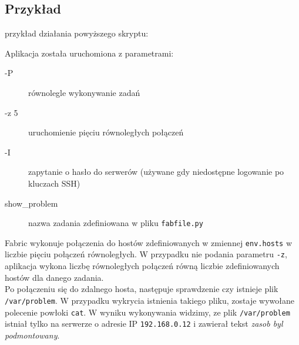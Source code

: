 \subsection{Przykład}

przykład działania powyższego skryptu:

Aplikacja została uruchomiona z parametrami:
\begin{description}
\item[-P] równolegle wykonywanie zadań
\item[-z 5] uruchomienie pięciu równoległych połączeń
\item[-I] zapytanie o hasło do serwerów (używane gdy niedostępne logowanie po kluczach SSH)
\item[show\_problem] nazwa zadania zdefiniowana w pliku \texttt{fabfile.py}
\end{description}
Fabric wykonuje połączenia do hostów zdefiniowanych w zmiennej \texttt{env.hosts} w liczbie pięciu połączeń równoległych.
W przypadku nie podania parametru \texttt{-z}, aplikacja wykona liczbę równoległych połączeń równą liczbie zdefiniowanych hostów dla danego zadania.\\
Po połączeniu się do zdalnego hosta, następuje sprawdzenie czy istnieje plik \texttt{/var/problem}. W przypadku wykrycia istnienia takiego pliku, zostaje wywołane polecenie powłoki \texttt{cat}.
W wyniku wykonywania widzimy, ze plik \texttt{/var/problem} istniał tylko na serwerze o adresie IP \texttt{192.168.0.12} i zawierał tekst \textit{zasob byl podmontowany}.
